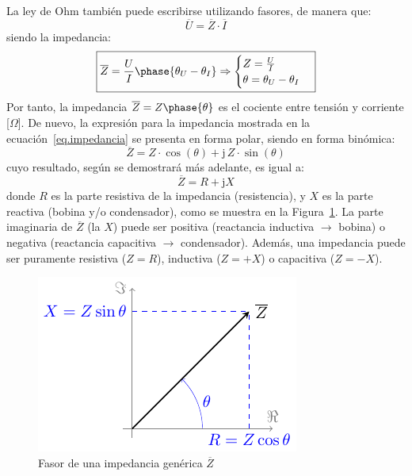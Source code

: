 	La ley de Ohm también puede escribirse utilizando fasores, de manera que: 
	\begin{equation}\label{eq.ohm_generalizada}
		\boxed{ \overline{U}=\overline{Z}\cdot\overline{I} }
	\end{equation}
	siendo la impedancia:
	\begin{equation}\label{eq.impedancia}
		\boxed{\overline{Z} = \frac{U}{I}\phase{\theta_U - \theta_I} \Rightarrow 
			\begin{cases}
				Z = \frac{U}{I}\\
				\theta = \theta_U - \theta_I
		\end{cases}}
	\end{equation}
	Por tanto, la impedancia $\overline{Z}=Z\phase{\theta}$ es el cociente entre tensión y corriente [$\Omega$]. De nuevo, la expresión para la impedancia mostrada en la ecuación~\eqref{eq.impedancia} se presenta en forma polar, siendo en forma binómica: 
	\begin{equation*}
		\overline{Z} = Z\cdot\cos(\theta)+\mathrm{j}\,Z\cdot\sin(\theta) %
	\end{equation*}
	cuyo resultado, según se demostrará más adelante, es igual a: 
	\begin{equation}
		\boxed{\overline{Z} =  R + \mathrm{j} X}
	\end{equation}
	donde $R$ es la parte resistiva de la impedancia (resistencia), y $X$ es la parte reactiva (bobina y/o condensador), como se muestra en la Figura~\ref{fig.fasorimpedancia}. La parte imaginaria de $\overline{Z}$ (la $X$) puede ser positiva (reactancia inductiva $\rightarrow$ bobina) o negativa (reactancia capacitiva $\rightarrow$ condensador). Además, una impedancia puede ser puramente resistiva ($Z=R$), inductiva ($Z=+X$) o capacitiva ($Z=-X$).
	\begin{figure}[H]
		\centering
		\includegraphics{../figs/fasorImpedancia.pdf}
		\caption{Fasor de una impedancia genérica $\overline{Z}$}
		\label{fig.fasorimpedancia}
	\end{figure}
	
